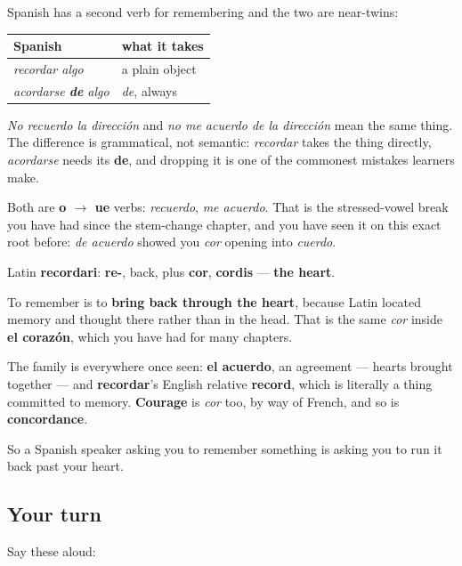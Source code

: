 \begin{grammarlens}[title={Grammar Lens: recordar is not acordarse}]
Spanish has a second verb for remembering and the two are near-twins:

\noindent
\begin{tabularx}{\linewidth}{@{}>{\raggedright\arraybackslash}X>{\raggedright\arraybackslash}X@{}}
\toprule
\textbf{Spanish} & \textbf{what it takes} \\
\midrule
\emph{recordar algo} & a plain object \\
\emph{acordarse \textbf{de} algo} & \emph{de}, always \\
\bottomrule
\end{tabularx}

\emph{No recuerdo la dirección} and \emph{no me acuerdo de la dirección} mean the same thing. The difference is grammatical, not semantic: \emph{recordar} takes the thing directly, \emph{acordarse} needs its \textbf{de}, and dropping it is one of the commonest mistakes learners make.

Both are \textbf{o $\to$ ue} verbs: \emph{recuerdo}, \emph{me acuerdo}. That is the stressed-vowel break you have had since the stem-change chapter, and you have seen it on this exact root before: \emph{de acuerdo} showed you \emph{cor} opening into \emph{cuerdo}.
\end{grammarlens}

\begin{cousinweb}
Latin \textbf{recordari}: \textbf{re-}, back, plus \textbf{cor}, \textbf{cordis} — \textbf{the heart}.

To remember is to \textbf{bring back through the heart}, because Latin located memory and thought there rather than in the head. That is the same \emph{cor} inside \textbf{el corazón}, which you have had for many chapters.

The family is everywhere once seen: \textbf{el acuerdo}, an agreement — hearts brought together — and \textbf{recordar}'s English relative \textbf{record}, which is literally a thing committed to memory. \textbf{Courage} is \emph{cor} too, by way of French, and so is \textbf{concordance}.

So a Spanish speaker asking you to remember something is asking you to run it back past your heart.
\end{cousinweb}

\subsection*{Your turn}
Say these aloud:

